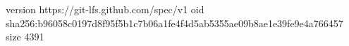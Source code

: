 version https://git-lfs.github.com/spec/v1
oid sha256:b96058c0197d8f95f5b1c7b06a1fe4f4d5ab5355ae09b8ae1e39fe9e4a766457
size 4391
